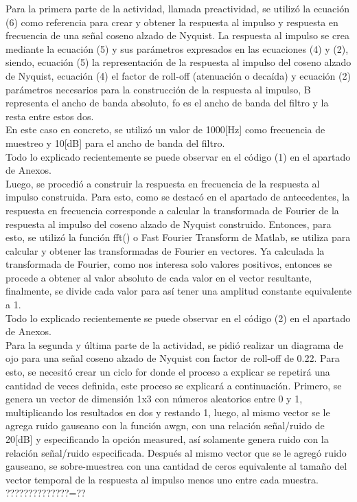 \documentclass[lettersize,journal]{IEEEtran}
\begin{document}
Para la primera parte de la actividad, llamada preactividad, se utilizó la ecuación (6) como referencia para crear y obtener la respuesta al impulso y respuesta en frecuencia de una señal coseno alzado de Nyquist. La respuesta al impulso se crea mediante la ecuación (5) y sus parámetros expresados en las ecuaciones (4) y (2), siendo, ecuación (5) la representación de la respuesta al impulso del coseno alzado de Nyquist, ecuación (4) el factor de roll-off (atenuación o decaída) y ecuación (2) parámetros necesarios para la construcción de la respuesta al impulso, B representa el ancho de banda absoluto, fo es el ancho de banda del filtro y la resta entre estos dos.\\
En este caso en concreto, se utilizó un valor de 1000[Hz] como frecuencia de muestreo y 10[dB] para el ancho de banda del filtro.
\\
Todo lo explicado recientemente se puede observar en el código (1) en el apartado de Anexos.\\

Luego, se procedió a construir la respuesta en frecuencia de la respuesta al impulso construida. Para esto, como se destacó en el apartado de antecedentes, la respuesta en frecuencia corresponde a calcular la transformada de Fourier de la respuesta al impulso del coseno alzado de Nyquist construido. Entonces, para esto, se utilizó la función fft() o Fast Fourier Transform de Matlab, se utiliza para calcular y obtener las transformadas de Fourier en vectores. Ya calculada la transformada de Fourier, como nos interesa solo valores positivos, entonces se procede a obtener al valor absoluto de cada valor en el vector resultante, finalmente, se divide cada valor para así tener una amplitud constante equivalente a 1.
\\
Todo lo explicado recientemente se puede observar en el código (2) en el apartado de Anexos.\\

Para la segunda y última parte de la actividad, se pidió realizar un diagrama de ojo para una señal coseno alzado de Nyquist con factor de roll-off de 0.22. Para esto, se necesitó crear un ciclo for donde el proceso a explicar se repetirá una cantidad de veces definida, este proceso se explicará a continuación. Primero, se genera un vector de dimensión 1x3 con números aleatorios entre 0 y 1, multiplicando los resultados en dos y restando 1, luego, al mismo vector se le agrega ruido gauseano con la función awgn, con una relación señal/ruido de 20[dB] y especificando la opción measured, así solamente genera ruido con la relación señal/ruido especificada. Después al mismo vector que se le agregó ruido gauseano, se sobre-muestrea con una cantidad de ceros equivalente al tamaño del vector temporal de la respuesta al impulso menos uno entre cada muestra. 
??????????????=??
\end{document}
